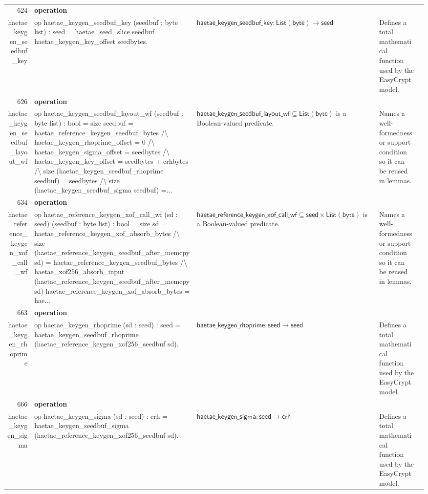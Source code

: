 \documentclass[10pt]{article}
\newcommand{\ec}[1]{\begingroup\ttfamily\scriptsize #1\endgroup}
\begin{document}
\begin{longtable}{r L{0.17\textwidth} L{0.26\textwidth} L{0.27\textwidth} L{0.20\textwidth}}
624 & \textbf{operation}\\\ec{haetae\_keygen\_seedbuf\_key} & \ec{op haetae\_keygen\_seedbuf\_key (seedbuf : byte list) : seed = haetae\_seed\_slice seedbuf haetae\_keygen\_key\_offset seedbytes.} & \(\mathsf{haetae\_keygen\_seedbuf\_key} : \mathsf{List}(\mathsf{byte}) \to \mathsf{seed}\) & Defines a total mathematical function used by the EasyCrypt model. \\
626 & \textbf{operation}\\\ec{haetae\_keygen\_seedbuf\_layout\_wf} & \ec{op haetae\_keygen\_seedbuf\_layout\_wf (seedbuf : byte list) : bool = size seedbuf = haetae\_reference\_keygen\_seedbuf\_bytes /\textbackslash{} haetae\_keygen\_rhoprime\_offset = 0 /\textbackslash{} haetae\_keygen\_sigma\_offset = seedbytes /\textbackslash{} haetae\_keygen\_key\_offset = seedbytes + crhbytes /\textbackslash{} size (haetae\_keygen\_seedbuf\_rhoprime seedbuf) = seedbytes /\textbackslash{} size (haetae\_keygen\_seedbuf\_sigma seedbuf) =...} & \(\mathsf{haetae\_keygen\_seedbuf\_layout\_wf} \subseteq \mathsf{List}(\mathsf{byte})\) is a Boolean-valued predicate. & Names a well-formedness or support condition so it can be reused in lemmas. \\
634 & \textbf{operation}\\\ec{haetae\_reference\_keygen\_xof\_call\_wf} & \ec{op haetae\_reference\_keygen\_xof\_call\_wf (sd : seed) (seedbuf : byte list) : bool = size sd = haetae\_reference\_keygen\_xof\_absorb\_bytes /\textbackslash{} size (haetae\_reference\_keygen\_seedbuf\_after\_memcpy sd) = haetae\_reference\_keygen\_seedbuf\_bytes /\textbackslash{} haetae\_xof256\_absorb\_input (haetae\_reference\_keygen\_seedbuf\_after\_memcpy sd) haetae\_reference\_keygen\_xof\_absorb\_bytes = hae...} & \(\mathsf{haetae\_reference\_keygen\_xof\_call\_wf} \subseteq \mathsf{seed} \times \mathsf{List}(\mathsf{byte})\) is a Boolean-valued predicate. & Names a well-formedness or support condition so it can be reused in lemmas. \\
663 & \textbf{operation}\\\ec{haetae\_keygen\_rhoprime} & \ec{op haetae\_keygen\_rhoprime (sd : seed) : seed = haetae\_keygen\_seedbuf\_rhoprime (haetae\_reference\_keygen\_xof256\_seedbuf sd).} & \(\mathsf{haetae\_keygen\_rhoprime} : \mathsf{seed} \to \mathsf{seed}\) & Defines a total mathematical function used by the EasyCrypt model. \\
666 & \textbf{operation}\\\ec{haetae\_keygen\_sigma} & \ec{op haetae\_keygen\_sigma (sd : seed) : crh = haetae\_keygen\_seedbuf\_sigma (haetae\_reference\_keygen\_xof256\_seedbuf sd).} & \(\mathsf{haetae\_keygen\_sigma} : \mathsf{seed} \to \mathsf{crh}\) & Defines a total mathematical function used by the EasyCrypt model. \\

\end{longtable}
\end{document}
